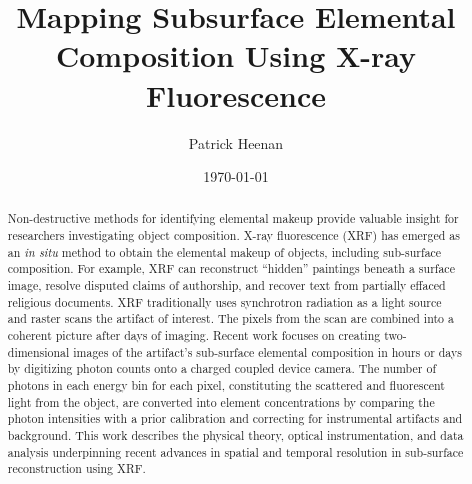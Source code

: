 \documentclass[%
  aip,12pt,tightenlines,
  amsthm,
 amsmath,amssymb,
 reprint,%
]{revtex4-1}
\newcommand{\firstp}[0]{\noindent}
\begin{document}

\singlespacing

\title[CU Boulder, Comps II, 2017]{Mapping Subsurface Elemental Composition Using X-ray Fluorescence}%

\author{Patrick Heenan }
%

\date{\today}%

\newpage


\begin{abstract}

\firstp Non-destructive methods for identifying elemental makeup provide valuable insight for researchers investigating object composition. X-ray fluorescence (XRF) has emerged as an \emph{in situ} method to obtain the elemental makeup of objects, including sub-surface composition. For example, XRF can reconstruct “hidden” paintings beneath a surface image, resolve disputed claims of authorship, and recover text from partially effaced religious documents. XRF traditionally uses synchrotron radiation as a light source and raster scans the artifact of interest. The pixels from the scan are combined into a coherent picture after days of imaging. Recent work focuses on creating two-dimensional images of the artifact's sub-surface elemental composition in hours or days by digitizing photon counts onto a charged coupled device camera. The number of photons in each energy bin for each pixel, constituting the scattered and fluorescent light from the object, are converted into element concentrations by comparing the photon intensities with a prior calibration and correcting for instrumental artifacts and background. This work describes the physical theory, optical instrumentation, and data analysis underpinning recent advances in spatial and temporal resolution in sub-surface reconstruction using XRF. 
\end{abstract}




\maketitle
\end{document}
